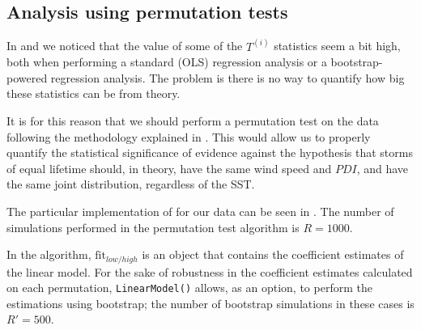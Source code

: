 \subsection{Analysis using permutation tests}\label{sec:perm-test}

In  and  we noticed that the value of some of the $T^{(i)}$ statistics seem a bit high, both when performing a standard (OLS) regression analysis or a bootstrap-powered regression analysis. The problem is there is no way to quantify how big these statistics can be from theory.

It is for this reason that we should perform a permutation test on the data following the methodology explained in . This would allow us to properly quantify the statistical significance of evidence against the hypothesis that storms of equal lifetime should, in theory, have the same wind speed and $PDI$, and have the same joint distribution, regardless of the SST.


\bigskip
The particular implementation of  for our data can be seen in . The number of simulations performed in the permutation test algorithm is $R = 1000$.

In the algorithm, $\text{fit}_{low/high}$ is an object that contains the coefficient estimates of the linear model. For the sake of robustness in the coefficient estimates calculated on each permutation, \texttt{LinearModel()} allows, as an option, to perform the estimations using bootstrap; the number of bootstrap simulations in these cases is $R' = 500$.

